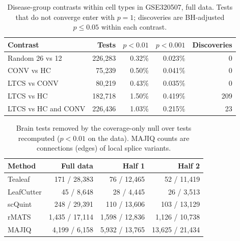 \documentclass[11pt]{article}
\begin{document}
\begin{table}[ht]
\centering
\small
\begin{tabular}{lrrrr}
\toprule
Contrast & Tests & $p<0.01$ & $p<0.001$ & Discoveries\\
\midrule
Random 26 vs 12 & 226{,}283 & 0.32\% & 0.023\% & 0\\
CONV vs HC & 75{,}239 & 0.50\% & 0.041\% & 0\\
LTCS vs CONV & 80{,}219 & 0.43\% & 0.035\% & 0\\
LTCS vs HC & 182{,}718 & 1.50\% & 0.419\% & 209\\
LTCS vs HC and CONV & 226{,}436 & 1.03\% & 0.215\% & 23\\
\bottomrule
\end{tabular}
\caption{Disease-group contrasts within cell types in GSE320507, full data. Tests that do not converge enter with $p=1$; discoveries are BH-adjusted $p\le0.05$ within each contrast.}
\label{tab:disease}
\end{table}

\begin{table}[ht]
\centering
\small
\begin{tabular}{lrrr}
\toprule
Method & Full data & Half 1 & Half 2\\
\midrule
Tealeaf & 171 / 28{,}383 & 76 / 12{,}465 & 52 / 11{,}419\\
LeafCutter & 45 / 8{,}648 & 28 / 4{,}445 & 26 / 3{,}513\\
scQuint & 248 / 29{,}391 & 110 / 13{,}606 & 103 / 13{,}129\\
rMATS & 1{,}435 / 17{,}114 & 1{,}598 / 12{,}836 & 1{,}126 / 10{,}738\\
MAJIQ & 4{,}199 / 6{,}158 & 5{,}932 / 13{,}765 & 13{,}625 / 21{,}434\\
\bottomrule
\end{tabular}
\caption{Brain tests removed by the coverage-only null over tests recomputed ($p<0.01$ on the data). MAJIQ counts are connections (edges) of local splice variants.}
\label{tab:coverage-removed}
\end{table}
\end{document}
